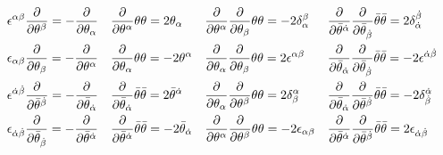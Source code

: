 \documentclass[CheatSheet]{subfiles}
\begin{document}
\begin{align*}
&
\epsilon^{\alpha\beta}\frac{\partial}{\partial\theta^\beta}=-\frac{\partial}{\partial\theta_\alpha}
&&
\frac{\partial}{\partial \theta^{\alpha}}\theta \theta =2 \theta_{\alpha}
&&
\frac{\partial}{\partial \theta^{\alpha}}\frac{\partial}{\partial \theta_{\beta}}\theta \theta =-2 \delta^{\beta}_{\alpha}
&&
\frac{\partial}{\partial \bar\theta^{{\dot\alpha}}}\frac{\partial}{\partial \bar\theta_{{\dot\beta}}}\bar\theta\bar\theta=2 \delta^{{\dot\beta}}_{{\dot\alpha}}
\\&
\epsilon_{\alpha\beta}\frac{\partial}{\partial\theta_\beta}=-\frac{\partial}{\partial\theta^\alpha}
&&
\frac{\partial}{\partial \theta_{\alpha}}\theta \theta =-2 \theta^{\alpha}
&&
\frac{\partial}{\partial \theta_{\alpha}}\frac{\partial}{\partial \theta_{\beta}}\theta \theta =2 \epsilon^{\alpha \beta}
&&
\frac{\partial}{\partial \bar\theta_{{\dot\alpha}}}\frac{\partial}{\partial \bar\theta_{{\dot\beta}}}\bar\theta\bar\theta=-2 \epsilon^{{\dot\alpha}{\dot\beta}}
\\&
\epsilon^{{\dot\alpha}{\dot\beta}}\frac{\partial}{\partial\bar\theta^{\dot\beta}}=-\frac{\partial}{\partial\bar\theta_{\dot\alpha}}
&&
\frac{\partial}{\partial \bar\theta_{{\dot\alpha}}}\bar\theta\bar\theta=2 \bar\theta^{{\dot\alpha}}
&&
\frac{\partial}{\partial \theta_{\alpha}}\frac{\partial}{\partial \theta^{\beta}}\theta \theta =2 \delta^{\alpha}_{\beta}
&&
\frac{\partial}{\partial \bar\theta_{{\dot\alpha}}}\frac{\partial}{\partial \bar\theta^{{\dot\beta}}}\bar\theta\bar\theta=-2 \delta^{{\dot\alpha}}_{{\dot\beta}}
\\&
\epsilon_{{\dot\alpha}{\dot\beta}}\frac{\partial}{\partial\bar\theta_{\dot\beta}}=-\frac{\partial}{\partial\bar\theta^{\dot\alpha}}
&&
\frac{\partial}{\partial \bar\theta^{{\dot\alpha}}}\bar\theta\bar\theta=-2 \bar\theta_{{\dot\alpha}}
&&
\frac{\partial}{\partial \theta^{\alpha}}\frac{\partial}{\partial \theta^{\beta}}\theta \theta =-2 \epsilon_{\alpha \beta}
&&
\frac{\partial}{\partial \bar\theta^{{\dot\alpha}}}\frac{\partial}{\partial \bar\theta^{{\dot\beta}}}\bar\theta\bar\theta=2 \epsilon_{{\dot\alpha}{\dot\beta}}
\end{align*}
\end{document}
